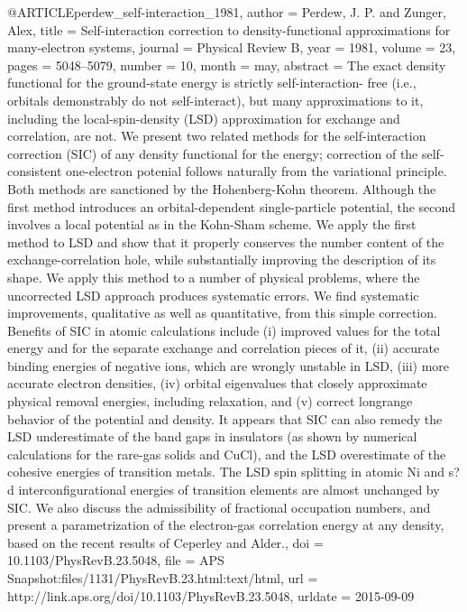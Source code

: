 @ARTICLE{perdew_self-interaction_1981,
  author = {Perdew, J. P. and Zunger, Alex},
  title = {Self-interaction correction to density-functional approximations
	for many-electron systems},
  journal = {Physical Review B},
  year = {1981},
  volume = {23},
  pages = {5048--5079},
  number = {10},
  month = may,
  abstract = {The exact density functional for the ground-state energy is strictly
	self-interaction- free (i.e., orbitals demonstrably do not self-interact),
	but many approximations to it, including the local-spin-density (LSD)
	approximation for exchange and correlation, are not. We present two
	related methods for the self-interaction correction (SIC) of any
	density functional for the energy; correction of the self-consistent
	one-electron potenial follows naturally from the variational principle.
	Both methods are sanctioned by the Hohenberg-Kohn theorem. Although
	the first method introduces an orbital-dependent single-particle
	potential, the second involves a local potential as in the Kohn-Sham
	scheme. We apply the first method to LSD and show that it properly
	conserves the number content of the exchange-correlation hole, while
	substantially improving the description of its shape. We apply this
	method to a number of physical problems, where the uncorrected LSD
	approach produces systematic errors. We find systematic improvements,
	qualitative as well as quantitative, from this simple correction.
	Benefits of SIC in atomic calculations include (i) improved values
	for the total energy and for the separate exchange and correlation
	pieces of it, (ii) accurate binding energies of negative ions, which
	are wrongly unstable in LSD, (iii) more accurate electron densities,
	(iv) orbital eigenvalues that closely approximate physical removal
	energies, including relaxation, and (v) correct longrange behavior
	of the potential and density. It appears that SIC can also remedy
	the LSD underestimate of the band gaps in insulators (as shown by
	numerical calculations for the rare-gas solids and CuCl), and the
	LSD overestimate of the cohesive energies of transition metals. The
	LSD spin splitting in atomic Ni and s?d interconfigurational energies
	of transition elements are almost unchanged by SIC. We also discuss
	the admissibility of fractional occupation numbers, and present a
	parametrization of the electron-gas correlation energy at any density,
	based on the recent results of Ceperley and Alder.},
  doi = {10.1103/PhysRevB.23.5048},
  file = {APS Snapshot:files/1131/PhysRevB.23.html:text/html},
  url = {http://link.aps.org/doi/10.1103/PhysRevB.23.5048},
  urldate = {2015-09-09}
}

